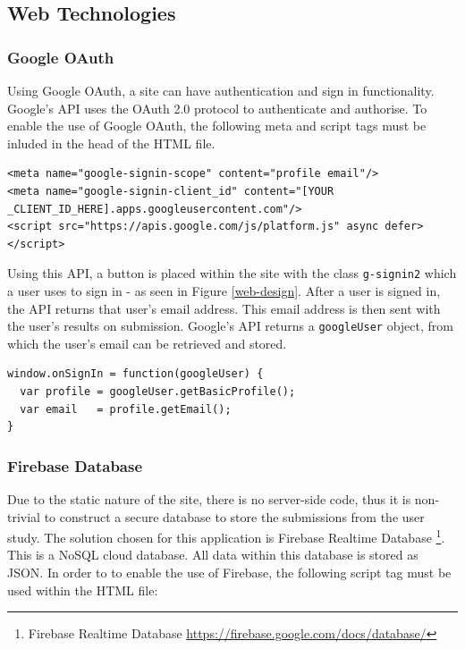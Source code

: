 \documentclass[ %
                    author={Elis Jones},
                supervisor={Dr. Kirsten Cater},
                    degree={BSc},
                     title={The Effect of Presentation Medium on Spatial Cognition},
                  subtitle={in the Virtual Environment},
                      year={2018} ]{dissertation}
\begin{document}
\subsection{Web Technologies}

\subsubsection{Google OAuth}

Using Google OAuth, a site can have authentication and sign in functionality. Google's API uses the OAuth 2.0 protocol to authenticate and authorise. To enable the use of Google OAuth, the following meta and script tags must be inluded in the head of the HTML file. 

\noindent \begin{minipage}{\textwidth}
\centering
\begin{lstlisting}
<meta name="google-signin-scope" content="profile email"/>
<meta name="google-signin-client_id" content="[YOUR _CLIENT_ID_HERE].apps.googleusercontent.com"/>
<script src="https://apis.google.com/js/platform.js" async defer></script>
\end{lstlisting}
\end{minipage}

Using this API, a button is placed within the site with the class \lstinline{g-signin2} which a user uses to sign in - as seen in Figure \ref{web-design}. After a user is signed in, the API returns that user's email address. This email address is then sent with the user's results on submission. Google's API returns a \lstinline{googleUser} object, from which the user's email can be retrieved and stored. 

\bigskip
\noindent \begin{minipage}{\textwidth}
\centering
\begin{lstlisting}
window.onSignIn = function(googleUser) {
  var profile = googleUser.getBasicProfile();
  var email   = profile.getEmail();
}
\end{lstlisting}
\end{minipage}


\subsubsection{Firebase Database}
Due to the static nature of the site, there is no server-side code, thus it is non-trivial to construct a secure database to store the submissions from the user study. The solution chosen for this application is Firebase Realtime Database \footnote{Firebase Realtime Database \url{https://firebase.google.com/docs/database/}}. This is a NoSQL cloud database. All data within this database is stored as JSON. In order to to enable the use of Firebase, the following script tag must be used within the HTML file:
\end{document}
